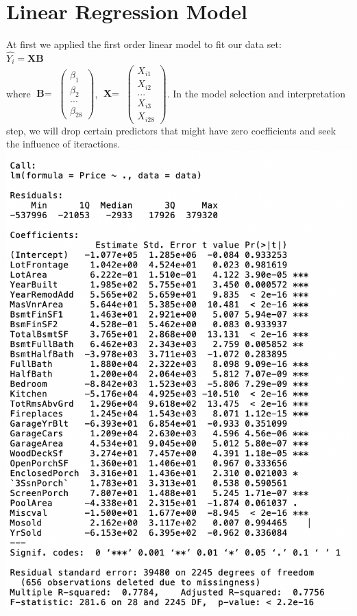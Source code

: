 \documentclass{article}
\begin{document}
\section*{Linear Regression Model}
At first we applied the first order linear model to fit our data set: \\
$\hat{Y_i} = \textbf{X}\textbf{B}$\\
where $\textbf{B} = $ $\begin{pmatrix} \beta_1 \\ \beta_2 \\ ... \\ \beta_{28} \end{pmatrix}$, $\textbf{X} = $ $\begin{pmatrix}X_{i1} \\ X_{i2} \\... \\  X_{i3} \\ X_{i28} \end{pmatrix}$. 
In the model selection and interpretation step, we will drop certain predictors that might have zero coefficients and seek the influence of iteractions.\\
\includegraphics[scale = 0.5]{reg1.png}\\
\end{document}

